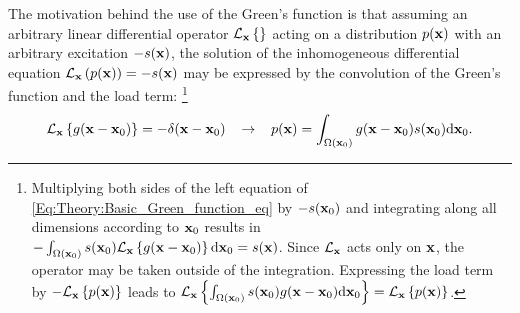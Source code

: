 The motivation behind the use of the Green's function is that assuming an arbitrary linear differential operator $\mathcal{L}_{\mathbf{x}}\left\{ \right\}$ acting on a distribution $p(\mathbf{x})$ with an arbitrary excitation $-s(\mathbf{x})$, the solution of the inhomogeneous differential equation $\mathcal{L}_{\mathbf{x}}\left(p(\mathbf{x})\right) = -s	(\mathbf{x})$ may be expressed by the convolution of the Green's function and the load term:
\footnote{Multiplying both sides of the left equation of \eqref{Eq:Theory:Basic_Green_function_eq} by $-s(\mathbf{x}_0)$ and integrating along all dimensions according to $\mathbf{x}_0$ results in
$-\int_{\Omega(\mathbf{x}_0)} s(\mathbf{x}_0)\mathcal{L}_{\mathbf{x}}\left\{ g(\mathbf{x}-\mathbf{x}_0) \right\} \mathrm{d} \mathbf{x}_0= s(\mathbf{x})$.
Since $\mathcal{L}_{\mathbf{x}}$ acts only on $\mathbf{x}$, the operator may be taken outside of the integration.
Expressing the load term by $-\mathcal{L}_{\mathbf{x}}\left\{ p(\mathbf{x}) \right\}$ leads to $\mathcal{L}_{\mathbf{x}}\left\{ \int_{\Omega(\mathbf{x}_0)} s(\mathbf{x}_0) g(\mathbf{x}-\mathbf{x}_0) \mathrm{d} \mathbf{x}_0 \right\} = \mathcal{L}_{\mathbf{x}}\left\{ p(\mathbf{x}) \right\}$.
}
\begin{equation}
\mathcal{L}_{\mathbf{x}}\left\{ g(\mathbf{x}-\mathbf{x}_0) \right\} = -\delta( \mathbf{x}-\mathbf{x}_0 ) \hspace{3mm} \rightarrow \hspace{3mm}
p(\mathbf{x}) = \int_{\Omega(\mathbf{x}_0)}  g(\mathbf{x}-\mathbf{x}_0) s(\mathbf{x}_0) \mathrm{d} \mathbf{x}_0.
\label{Eq:Theory:Basic_Green_function_eq}
\end{equation}

